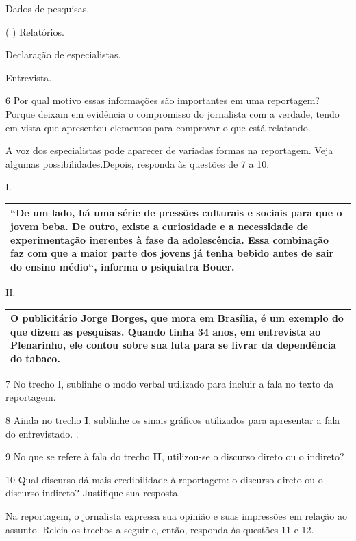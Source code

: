 \begin{itemize}
\begin{itemize}
{\begin{itemize}
\begin{itemize}
 Dados de pesquisas.

( ) Relatórios.

 Declaração de especialistas.

 Entrevista.

\num{6} Por qual motivo essas informações são importantes em uma
reportagem?  Porque deixam em evidência o compromisso do
jornalista com a verdade, tendo em vista que apresentou elementos para
comprovar o que está relatando.

A voz dos especialistas pode aparecer de variadas formas na reportagem.
Veja algumas possibilidades.Depois, responda às questões de 7 a 10.

I.

\begin{longtable}[]{@{}l@{}}
\toprule
{``}De um lado, há uma série de pressões culturais e sociais para que o
jovem beba. De outro, existe a curiosidade e a necessidade de
experimentação inerentes à fase da adolescência. Essa combinação faz com
que a maior parte dos jovens já tenha bebido antes de sair do ensino
médio{``}, {informa} o psiquiatra Bouer.\tabularnewline
\bottomrule
\end{longtable}

II.

\begin{longtable}[]{@{}l@{}}
\toprule
O publicitário Jorge Borges, que mora em Brasília, é um exemplo do que
dizem as pesquisas. Quando tinha 34 anos, em entrevista ao Plenarinho,
ele contou sobre sua luta para se livrar da dependência do
tabaco.\tabularnewline
\bottomrule
\end{longtable}

\num{7} No trecho I, sublinhe o modo verbal utilizado para incluir a
fala no texto da reportagem. 

\num{8} Ainda no trecho \textbf{I}, sublinhe os sinais gráficos
utilizados para apresentar a fala do entrevistado.
.

\num{9} No que se refere à fala do trecho \textbf{II}, utilizou-se o
discurso direto ou o indireto?  

\num{10} Qual discurso dá mais credibilidade à reportagem: o discurso
direto ou o discurso indireto? Justifique sua resposta. 

Na reportagem, o jornalista expressa sua opinião e suas impressões em
relação ao assunto. Releia os trechos a seguir e, então, responda às
questões 11 e 12.


\end{itemize}
\end{itemize}}
\end{itemize}
\end{itemize}
